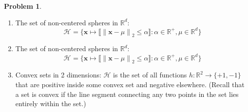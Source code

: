 \documentclass[10pt]{exam}
\theoremstyle{definition}
\newtheorem{problem}{Problem}
\newtheorem{defn}{Definition}
\newcommand{\R}{\mathbb R}
\DeclareMathOperator*{\argmin}{arg\,min}
\newcommand{\Eout}{E_{\text{out}}}
\newcommand{\x}{\mathbf x}
\newcommand{\ltwo}[1]{{\lVert {#1} \rVert}_2}
\newcommand{\HH}[1]{\mathcal H_{\text{#1}}}
\begin{document}
\begin{problem}
\begin{enumerate}
    \item The set of non-centered spheres in $\R^d$:
        \begin{equation}
            \HH{} = \bigg\{ \x \mapsto \big\llbracket \ltwo{\x - \mu} \le \alpha \big\rrbracket : \alpha \in \R^+, \mu \in \R^d \bigg\}
        \end{equation}
\vspace{4in}

    \item The set of non-centered spheres in $\R^d$:
        \begin{equation}
            \HH{} = \bigg\{ \x \mapsto \big\llbracket \ltwo{\x - \mu} \le \alpha \big\rrbracket : \alpha \in \R^+, \mu \in \R^d \bigg\}
        \end{equation}
\vspace{4in}

    \item Convex sets in 2 dimensions:
        $\mathcal H$ is the set of all functions $h : \R^2 \to \{+1, -1\}$ that are positive inside some convex set and negative elsewhere.
            (Recall that a set is convex if the line segment connecting any two points in the set lies entirely within the set.)
\vspace{4in}

    \end{enumerate}
\end{problem}



\end{document}

